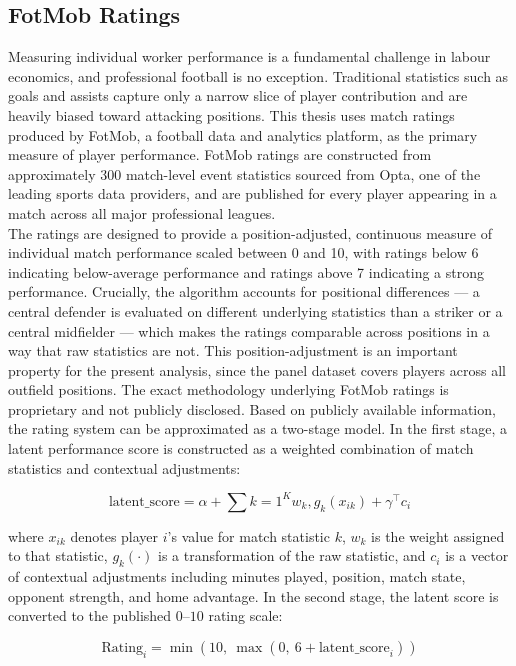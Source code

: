 \documentclass{article}
\begin{document}
\subsection{FotMob Ratings}
Measuring individual worker performance is a fundamental challenge in labour economics, and professional football is no exception. Traditional statistics such as goals and assists capture only a narrow slice of player contribution and are heavily biased toward attacking positions. This thesis uses match ratings produced by FotMob, a football data and analytics platform, as the primary measure of player performance. FotMob ratings are constructed from approximately 300 match-level event statistics sourced from Opta, one of the leading sports data providers, and are published for every player appearing in a match across all major professional leagues. \\

The ratings are designed to provide a position-adjusted, continuous measure of individual match performance scaled between 0 and 10, with ratings below 6 indicating below-average performance and ratings above 7 indicating a strong performance. Crucially, the algorithm accounts for positional differences — a central defender is evaluated on different underlying statistics than a striker or a central midfielder — which makes the ratings comparable across positions in a way that raw statistics are not. This position-adjustment is an important property for the present analysis, since the panel dataset covers players across all outfield positions.
The exact methodology underlying FotMob ratings is proprietary and not publicly disclosed. Based on publicly available information, the rating system can be approximated as a two-stage model. In the first stage, a latent performance score is constructed as a weighted combination of match statistics and contextual adjustments:

$$
\text{latent\_score} = \alpha + \sum{k=1}^{K} w_k , g_k(x_{ik}) + \gamma^{\top} c_i
$$

where $x_{ik}$ denotes player $i$'s value for match statistic $k$, $w_k$ is the weight assigned to that statistic, $g_k(\cdot)$ is a transformation of the raw statistic, and $c_i$ is a vector of contextual adjustments including minutes played, position, match state, opponent strength, and home advantage. In the second stage, the latent score is converted to the published $0$--$10$ rating scale:

$$
\text{Rating}_i = \min\left(10,\ \max\left(0,\ 6 + \text{latent\_score}_i\right)\right)
$$
\end{document}
